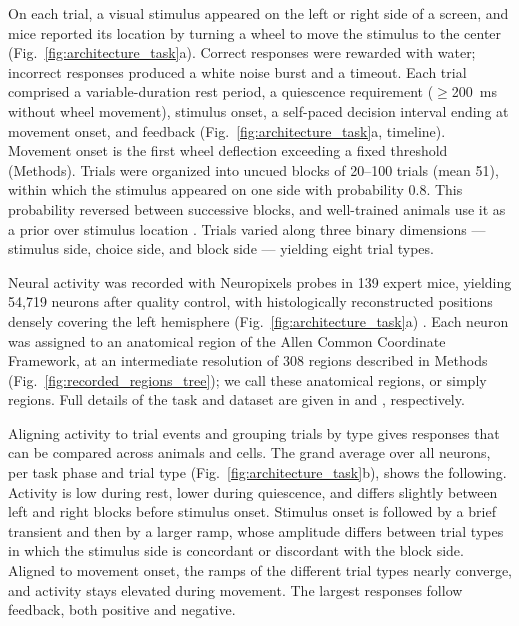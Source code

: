 \documentclass[10pt,lineno]{elife}
\begin{document}
On each trial, a visual stimulus appeared on the left or right side of a screen, and mice reported its location by turning a wheel to move the stimulus to the center (Fig.~\ref{fig:architecture_task}a). Correct responses were rewarded with water; incorrect responses produced a white noise burst and a timeout. Each trial comprised a variable-duration rest period, a quiescence requirement ($\geq$200~ms without wheel movement), stimulus onset, a self-paced decision interval ending at movement onset, and feedback (Fig.~\ref{fig:architecture_task}a, timeline). Movement onset is the first wheel deflection exceeding a fixed threshold (Methods). Trials were organized into uncued blocks of 20--100 trials (mean 51), within which the stimulus appeared on one side with probability 0.8. This probability reversed between successive blocks, and well-trained animals use it as a prior over stimulus location \cite{laboratory2021standardized, findling2023brain}. Trials varied along three binary dimensions --- stimulus side, choice side, and block side --- yielding eight trial types.

Neural activity was recorded with Neuropixels probes in 139 expert mice, yielding 54,719 neurons after quality control, with histologically reconstructed positions densely covering the left hemisphere (Fig.~\ref{fig:architecture_task}a) \cite{international2025brain}. Each neuron was assigned to an anatomical region of the Allen Common Coordinate Framework, at an intermediate resolution of 308 regions described in Methods (Fig.~\ref{fig:recorded_regions_tree}); we call these anatomical regions, or simply regions. Full details of the task and dataset are given in \cite{laboratory2021standardized} and \cite{international2025brain}, respectively.

Aligning activity to trial events and grouping trials by type gives responses that can be compared across animals and cells. The grand average over all neurons, per task phase and trial type (Fig.~\ref{fig:architecture_task}b), shows the following. Activity is low during rest, lower during quiescence, and differs slightly between left and right blocks before stimulus onset. Stimulus onset is followed by a brief transient and then by a larger ramp, whose amplitude differs between trial types in which the stimulus side is concordant or discordant with the block side. Aligned to movement onset, the ramps of the different trial types nearly converge, and activity stays elevated during movement. The largest responses follow feedback, both positive and negative.
\end{document}

